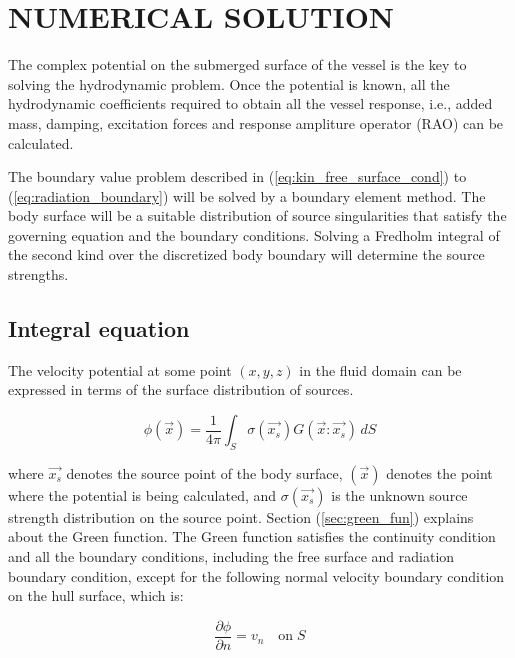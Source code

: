\chapter{NUMERICAL SOLUTION}
The complex potential on the submerged surface of the vessel is the key to solving the hydrodynamic problem. 
Once the potential is known, all the hydrodynamic coefficients required 
to obtain all the vessel response, i.e., added mass, damping, excitation forces and 
response ampliture operator (RAO) can be calculated.

The boundary value problem described in (\ref{eq:kin_free_surface_cond}) to 
(\ref{eq:radiation_boundary})  will be solved by a boundary element method. 
The body surface will be a suitable distribution of source singularities that satisfy 
the governing equation and the boundary conditions. Solving a Fredholm integral of the 
second kind over the discretized body boundary will determine the source strengths. 

\section{Integral equation}
The velocity potential at some point $(x, y, z)$ in the fluid domain can be expressed in 
terms of the surface distribution of sources.

\begin{equation}
    \label{eq:vel_pot}
    \phi(\vec{x}) = \frac{1}{4\pi}\int_S \sigma(\vec{x_s})G(\vec{x}:\vec{x_s})\,dS
\end{equation}

where $\vec{x_s}$ denotes the source point of the body surface, $(\vec{x})$ denotes the 
point where the potential is being calculated, and $\sigma(\vec{x_s})$ is the unknown 
source strength distribution on the source point. Section (\ref{sec:green_fun})
explains about the Green function. 
The Green function satisfies the continuity condition and all the boundary conditions, 
including the free surface and radiation boundary condition, except for the following 
normal velocity boundary condition on the hull surface, which is:

\begin{equation}
    \label{eq:vel_boundary_cond}
    \frac{\partial \phi}{\partial n} = v_n \quad \text{on}\; S
\end{equation}

